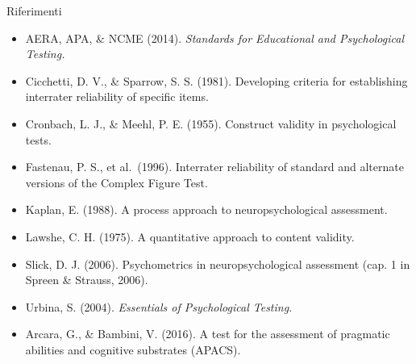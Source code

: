 \documentclass[
  ignorenonframetext,
  aspectratio=169,
]{beamer}
\providecommand{\tightlist}{%
  \setlength{\itemsep}{0pt}\setlength{\parskip}{0pt}}
\begin{document}
\begin{frame}{Riferimenti}
\label{riferimenti-1}
\footnotesize

\begin{itemize}
\tightlist
\item
  AERA, APA, \& NCME (2014). \emph{Standards for Educational and
  Psychological Testing.}
\item
  Cicchetti, D. V., \& Sparrow, S. S. (1981). Developing criteria for
  establishing interrater reliability of specific items.
\item
  Cronbach, L. J., \& Meehl, P. E. (1955). Construct validity in
  psychological tests.
\item
  Fastenau, P. S., et al.~(1996). Interrater reliability of standard and
  alternate versions of the Complex Figure Test.
\item
  Kaplan, E. (1988). A process approach to neuropsychological
  assessment.
\item
  Lawshe, C. H. (1975). A quantitative approach to content validity.
\item
  Slick, D. J. (2006). Psychometrics in neuropsychological assessment
  (cap. 1 in Spreen \& Strauss, 2006).
\item
  Urbina, S. (2004). \emph{Essentials of Psychological Testing.}
\item
  Arcara, G., \& Bambini, V. (2016). A test for the assessment of
  pragmatic abilities and cognitive substrates (APACS).
\end{itemize}
\end{frame}
\end{document}
